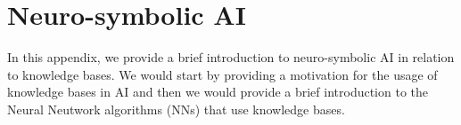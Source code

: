 

%
\chapter*{\thechapter \quad Neuro-symbolic AI}
\label{appendixB}
In this appendix, we provide a brief introduction to neuro-symbolic AI in relation to knowledge bases.
We would start by providing a motivation for the usage of knowledge bases in AI and then we would
provide a brief introduction to the Neural Neutwork algorithms (NNs) that use knowledge bases.


